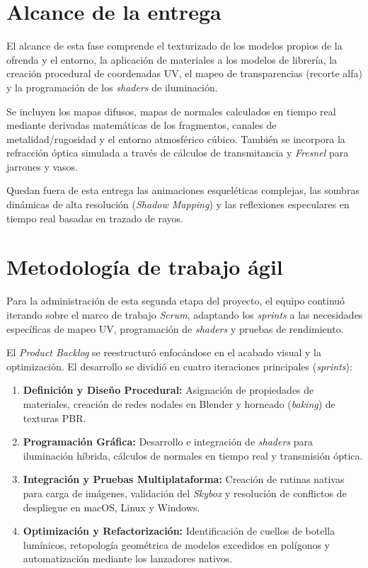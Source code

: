 \documentclass[letter,11pt]{article}
\begin{document}
	\section{Alcance de la entrega}
	El alcance de esta fase comprende el texturizado de los modelos propios de la ofrenda y el entorno, la aplicación de materiales a los modelos de librería, la creación procedural de coordenadas UV, el mapeo de transparencias (recorte alfa) y la programación de los \textit{shaders} de iluminación.
	
	Se incluyen los mapas difusos, mapas de normales calculados en tiempo real mediante derivadas matemáticas de los fragmentos, canales de metalidad/rugosidad y el entorno atmosférico cúbico. También se incorpora la refracción óptica simulada a través de cálculos de transmitancia y \textit{Fresnel} para jarrones y vasos.
	
	Quedan fuera de esta entrega las animaciones esqueléticas complejas, las sombras dinámicas de alta resolución (\textit{Shadow Mapping}) y las reflexiones especulares en tiempo real basadas en trazado de rayos.
	
	\section{Metodología de trabajo ágil}
	Para la administración de esta segunda etapa del proyecto, el equipo continuó iterando sobre el marco de trabajo \textit{Scrum}, adaptando los \textit{sprints} a las necesidades específicas de mapeo UV, programación de \textit{shaders} y pruebas de rendimiento.
	
	El \textit{Product Backlog} se reestructuró enfocándose en el acabado visual y la optimización. El desarrollo se dividió en cuatro iteraciones principales (\textit{sprints}):
	\begin{enumerate}[leftmargin=*]
		\item \textbf{Definición y Diseño Procedural:} Asignación de propiedades de materiales, creación de redes nodales en Blender y horneado (\textit{baking}) de texturas PBR.
		\item \textbf{Programación Gráfica:} Desarrollo e integración de \textit{shaders} para iluminación híbrida, cálculos de normales en tiempo real y transmisión óptica.
		\item \textbf{Integración y Pruebas Multiplataforma:} Creación de rutinas nativas para carga de imágenes, validación del \textit{Skybox} y resolución de conflictos de despliegue en macOS, Linux y Windows.
		\item \textbf{Optimización y Refactorización:} Identificación de cuellos de botella lumínicos, retopología geométrica de modelos excedidos en polígonos y automatización mediante los lanzadores nativos.
	\end{enumerate}
	
\end{document}
